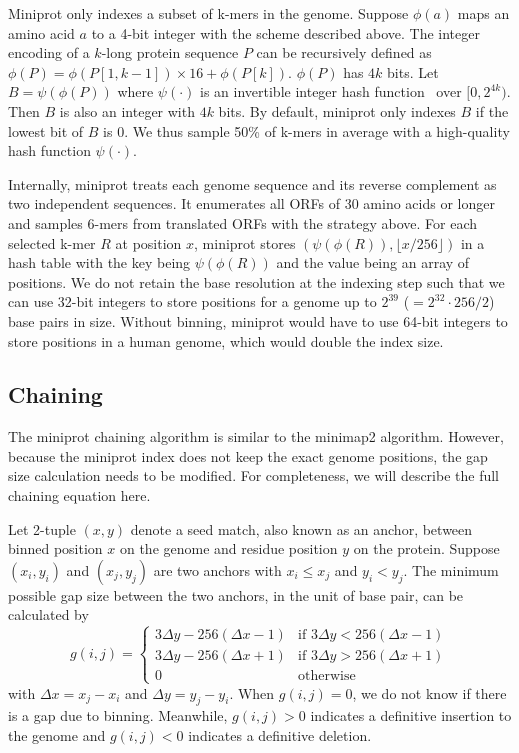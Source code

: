 \documentclass{bioinfo}
\begin{document}
\begin{methods}
Miniprot only indexes a subset of k-mers in the genome. Suppose $\phi(a)$ maps
an amino acid $a$ to a 4-bit integer with the scheme described above. The
integer encoding of a $k$-long protein sequence $P$ can be recursively defined as
$\phi(P)=\phi(P[1,k-1])\times16+\phi(P[k])$. $\phi(P)$ has $4k$ bits. Let
$B=\psi(\phi(P))$ where $\psi(\cdot)$ is an invertible integer hash
function~\citep{Li:2016aa} over $[0,2^{4k})$. Then $B$ is also an integer with
$4k$ bits. By default, miniprot only indexes $B$ if the lowest bit of $B$ is 0.
We thus sample 50\% of k-mers in average with a high-quality hash function
$\psi(\cdot)$.

Internally, miniprot treats each genome sequence and its reverse complement as
two independent sequences. It enumerates all ORFs of 30 amino acids or longer
and samples 6-mers from translated ORFs with the strategy above. For
each selected k-mer $R$ at position $x$, miniprot stores
$(\psi(\phi(R)), \lfloor x/256\rfloor)$ in a hash table with the key being
$\psi(\phi(R))$ and the value being an array of positions. We do not retain the
base resolution at the indexing step such that we can use 32-bit integers to
store positions for a genome up to $2^{39}$ ($=2^{32}\cdot 256/2$) base pairs
in size. Without binning, miniprot would have to use 64-bit integers to store
positions in a human genome, which would double the index size.

\subsection{Chaining}

The miniprot chaining algorithm is similar to the minimap2 algorithm.
However, because the miniprot index does not keep the exact genome positions,
the gap size calculation needs to be modified. For completeness, we will
describe the full chaining equation here.

Let 2-tuple $(x,y)$ denote a seed match, also known as an anchor, between binned position
$x$ on the genome and residue position $y$ on the protein. Suppose $(x_i,y_i)$
and $(x_j,y_j)$ are two anchors with $x_i\le x_j$ and $y_i<y_j$. The
minimum possible gap size between the two anchors, in the unit of base pair,
can be calculated by
\begin{equation}\label{eq:gap}
g(i,j)=\left\{\begin{array}{ll}
3\Delta y-256(\Delta x-1) & \mbox{if $3\Delta y<256(\Delta x-1)$}\\
3\Delta y-256(\Delta x+1) & \mbox{if $3\Delta y>256(\Delta x+1)$}\\
0 & \mbox{otherwise}
\end{array}\right.
\end{equation}
with $\Delta x=x_j-x_i$ and $\Delta y=y_j-y_i$. When $g(i,j)=0$, we do not know
if there is a gap due to binning. Meanwhile, $g(i,j)>0$ indicates a definitive
insertion to the genome and $g(i,j)<0$ indicates a definitive deletion.


\end{methods}
\end{document}
